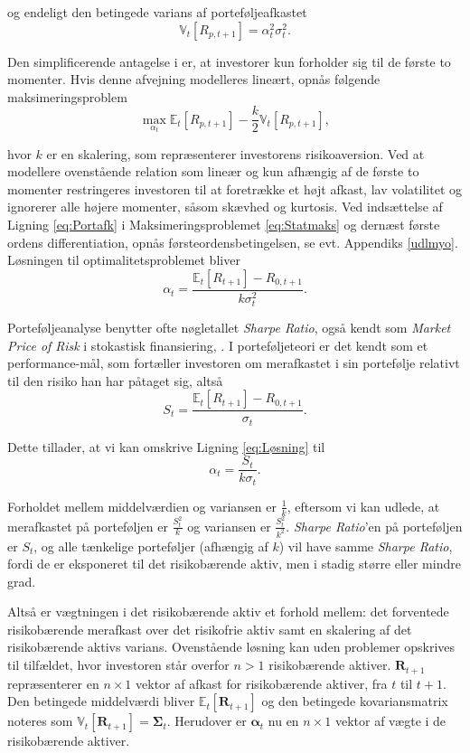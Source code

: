 \documentclass[
  a4paper,
  oneside]{memoir}
\begin{document}
og endeligt den betingede varians af porteføljeafkastet
\begin{equation}
\mathbb{V}_t\left[R_{p,t+1}\right]=\alpha_t^2\sigma_t^2.\label{eq:Varport}
\end{equation}

Den simplificerende antagelse i \citep{Markowitz1952} er, at investorer kun forholder sig til de første to momenter. Hvis denne afvejning modelleres lineært, opnås følgende maksimeringsproblem
\begin{equation}
\max_{\alpha_t} \mathbb{E}_t\left[R_{p,t+1}\right] -\frac{k}{2} \mathbb{V}_t\left[R_{p,t+1}\right],\label{eq:Statmaks}
\end{equation}

hvor \(k\) er en skalering, som repræsenterer investorens risikoaversion. Ved at modellere ovenstående relation som lineær og kun afhængig af de første to momenter restringeres investoren til at foretrække et højt afkast, lav volatilitet og ignorerer alle højere momenter, såsom skævhed og kurtosis. Ved indsættelse af Ligning \eqref{eq:Portafk} i Maksimeringsproblemet \eqref{eq:Statmaks} og dernæst første ordens differentiation, opnås førsteordensbetingelsen, se evt. Appendiks \ref{udlmyo}. Løsningen til optimalitetsproblemet bliver
\begin{equation}
\alpha_t = \frac{\mathbb{E}_t\left[R_{t+1}\right]-R_{0,t+1}}{k\sigma_t^2}.\label{eq:Løsning}
\end{equation}

Porteføljeanalyse benytter ofte nøgletallet \emph{Sharpe Ratio}, også kendt som \emph{Market Price of Risk} i stokastisk finansiering, \citep{Bjork2009}. I porteføljeteori er det kendt som et performance-mål, som fortæller investoren om merafkastet i sin portefølje relativt til den risiko han har påtaget sig, altså
\[S_t=\frac{\mathbb{E}_t\left[R_{t+1}\right]-R_{0,t+1}}{\sigma_t}.\]

Dette tillader, at vi kan omskrive Ligning \eqref{eq:Løsning} til
\[\alpha_t=\frac{S_t}{k\sigma_t}.\]

Forholdet mellem middelværdien og variansen er \(\tfrac{1}{k}\), eftersom vi kan udlede, at merafkastet på porteføljen er \(\tfrac{S_t^2}{k}\) og variansen er \(\tfrac{S_t^2}{k^2}\). \emph{Sharpe Ratio}'en på porteføljen er \(S_t\), og alle tænkelige porteføljer (afhængig af \(k\)) vil have samme \emph{Sharpe Ratio}, fordi de er eksponeret til det risikobærende aktiv, men i stadig større eller mindre grad.

Altså er vægtningen i det risikobærende aktiv et forhold mellem: det forventede risikobærende merafkast over det risikofrie aktiv samt en skalering af det risikobærende aktivs varians. Ovenstående løsning kan uden problemer opskrives til tilfældet, hvor investoren står overfor \(n>1\) risikobærende aktiver. \(\bm{R}_{t+1}\) repræsenterer en \(n\times 1\) vektor af afkast for risikobærende aktiver, fra \(t\) til \(t+1\). Den betingede middelværdi bliver \(\mathbb{E}_t\left[\bm{R}_{t+1}\right]\) og den betingede kovariansmatrix noteres som \(\mathbb{V}_t\left[\bm{R}_{t+1}\right]=\bm{\Sigma}_t\). Herudover er \(\bm{\alpha}_t\) nu en \(n\times 1\) vektor af vægte i de risikobærende aktiver.
\end{document}
